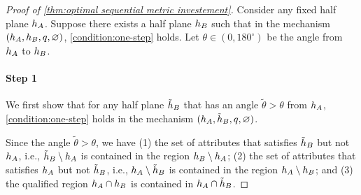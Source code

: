 






\begin{proof}[Proof of \cref{thm:optimal sequential metric investement}]
    



    Consider any fixed half plane $h_A$. Suppose there exists a half plane $h_B$ such that in the  mechanism $(h_A,h_B,q,\varnothing)$, \cref{condition:one-step} holds. 
    Let $\theta \in (0, 180^{\circ})$ be the angle from $h_A$ to $h_B$. 
     

    \paragraph{Step 1}
    We first show that for any half plane $\tilde {h}_B$ that has an angle $\tilde \theta > \theta$ from $h_A$,
    \cref{condition:one-step} holds in the  mechanism $(h_A,\tilde{h}_B,q,\varnothing)$.
    
    Since the angle $\tilde \theta > \theta$, we have (1) the set of attributes that satisfies $\tilde {h}_B$ but not $h_A$, i.e., $\tilde {h}_B \setminus h_A$  is contained in the region $h_B \setminus h_A$; (2) the set of attributes that satisfies $h_A$ but not $\tilde {h}_B$, i.e., $ h_A \setminus \tilde{h}_B$  is contained in the region $h_A \setminus h_B$; and (3) the qualified region $h_A \cap h_B$ is contained in $h_A \cap \tilde {h}_B$. 
    

\end{proof}
